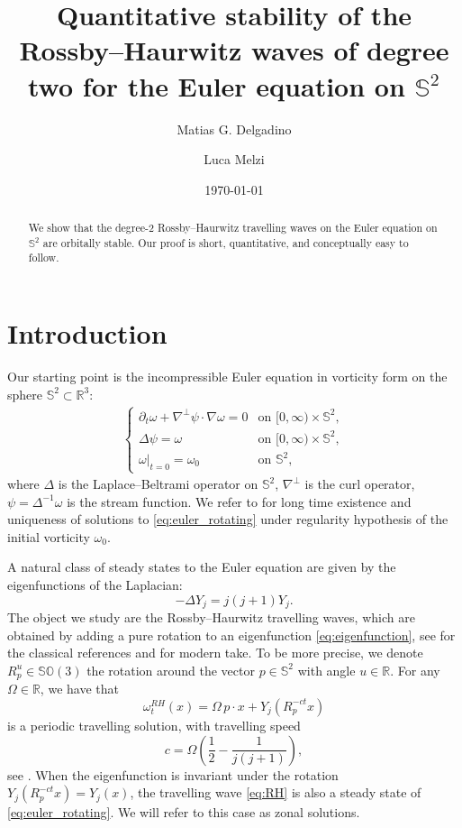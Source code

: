 \documentclass{amsart}
\title{Quantitative stability of the Rossby--Haurwitz waves of degree two for the Euler equation on $\mathbb{S}^2$}
\author{Matias G. Delgadino}
\author{Luca Melzi}
\date{\today}
\def\R{{\mathbb{R}}}
\def\esse{{\mathbb{S}}}
\begin{document}
\begin{abstract}
    We show that the degree-2 Rossby--Haurwitz travelling waves on the Euler equation on $\mathbb{S}^2$ are orbitally stable. Our proof is short, quantitative, and conceptually easy to follow.
\end{abstract}

\maketitle

\section{Introduction}
Our starting point is the incompressible Euler equation in vorticity form on the sphere $\mathbb{S}^2\subset\R^3$:
\begin{align}
\begin{cases}
    \partial_t\omega+\nabla^\perp\psi\cdot \nabla\omega=0&\text{on }[0,\infty)\times\mathbb{S}^2,\\
    \Delta\psi=\omega&\text{on }[0,\infty)\times\mathbb{S}^2,\\
    \omega|_{t=0}=\omega_0&\text{on }\mathbb{S}^2,
    \label{eq:euler_rotating}
\end{cases}
\end{align}
where $\Delta$ is the Laplace--Beltrami operator on $\mathbb{S}^2$, $\nabla^\perp$ is the curl operator, $\psi=\Delta^{-1}\omega$ is the stream function. We refer to \cite{Taylor2016} for long time existence and uniqueness of solutions to \eqref{eq:euler_rotating} under regularity hypothesis of the initial vorticity $\omega_0$.

A natural class of steady states to the Euler equation are given by the eigenfunctions of the Laplacian:
\begin{equation}\label{eq:eigenfunction}
    -\Delta Y_{j}= j(j+1) Y_{j}.
\end{equation}
The object we study are the Rossby--Haurwitz travelling waves, which are obtained by adding a pure rotation to an eigenfunction \eqref{eq:eigenfunction}, see \cite{rossby1939,haurwitz1940} for the classical references and \cite{Costantin2022} for modern take. To be more precise, we denote $R_p^u\in \mathbb{SO}(3)$ the rotation around the vector $p\in\esse^2$ with angle $u\in \R$. For any $\Omega\in \R$, we have that
\begin{equation}\label{eq:RH}
\omega^{RH}_t(x)=\Omega\, p\cdot x+Y_{j}\left(R_p^{-ct}x\right)    
\end{equation}
is a periodic travelling solution, with travelling speed
\begin{equation}\label{eq:travellingspeed}
    c=\Omega\left(\frac{1}{2}-\frac{1}{j(j+1)}\right),
\end{equation}
see \cite[Appendix A]{cao2023stabilitydegree2rossbyhaurwitzwaves}. When the eigenfunction is invariant under the rotation $Y_j(R_p^{-ct}x)=Y_j(x)$, the travelling wave \eqref{eq:RH} is also a steady state of \eqref{eq:euler_rotating}. We will refer to this case as zonal solutions.
\end{document}

